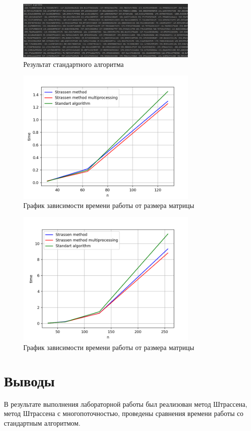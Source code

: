\documentclass[a4paper, 14pt]{extarticle}
\begin{document}
\begin{figure}[!htb]
	\centering
	\includegraphics[width=0.8\textwidth]{img3}
\caption{Результат стандартного алгоритма}
\label{fig:img3}
\end{figure}

\begin{figure}[!htb]
	\centering
	\includegraphics[width=0.8\textwidth]{img4}
\caption{График зависимости времени работы от размера матрицы}
\label{fig:img4}
\end{figure}

\begin{figure}[!htb]
	\centering
	\includegraphics[width=0.8\textwidth]{img5}
\caption{График зависимости времени работы от размера матрицы}
\label{fig:img5}
\end{figure}

\section{Выводы}\label{Sect::conclusion}

В результате выполнения лабораторной работы был реализован метод Штрассена, метод Штрассена с многопоточностью, проведены сравнения времени работы со стандартным алгоритмом.
\end{document}
